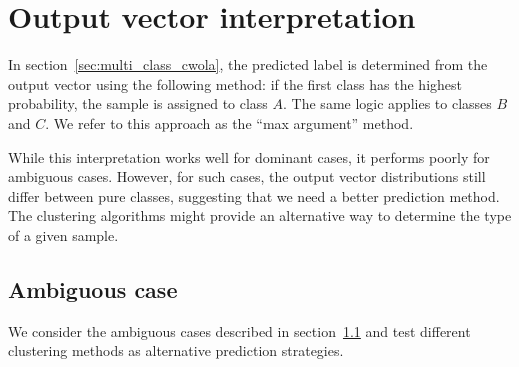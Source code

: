 \documentclass[12pt]{article}
\begin{document}
\section{Output vector interpretation}%
\label{sec:output_vector_interpretation}
    In section~\ref{sec:multi_class_cwola}, the predicted label is determined from the output vector using the following method: if the first class has the highest probability, the sample is assigned to class $A$. The same logic applies to classes $B$ and $C$. We refer to this approach as the ``max argument'' method. 

    While this interpretation works well for dominant cases, it performs poorly for ambiguous cases. However, for such cases, the output vector distributions still differ between pure classes, suggesting that we need a better prediction method. The clustering algorithms might provide an alternative way to determine the type of a given sample.

    \subsection{Ambiguous case}%
    \label{sub:ambiguous_case}
        We consider the ambiguous cases described in section~\ref{sub:ambiguous_case} and test different clustering methods as alternative prediction strategies.
\end{document}
